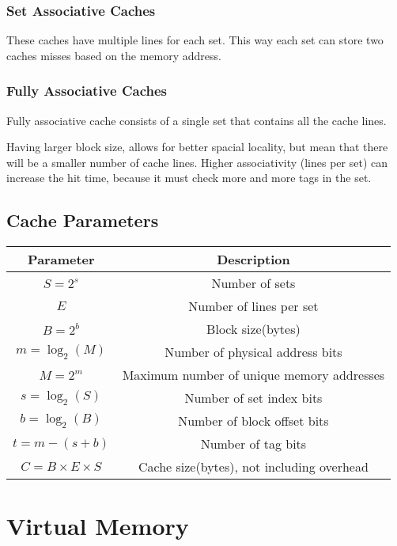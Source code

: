 \documentclass[10pt]{armath}
\begin{document}
\subsubsection{Set Associative Caches}%
\label{ssub:set_associative_caches}

These caches have multiple lines for each set. This way each set can store two
caches misses based on the memory address.

\subsubsection{Fully Associative Caches}%
\label{ssub:fully_associative_caches}

Fully associative cache consists of a single set that contains all the cache
lines.

Having larger block size, allows for better spacial locality, but mean that
there will be a smaller number of cache lines. Higher associativity (lines per
set) can increase the hit time, because it must check more and more tags in the
set.

\subsection{Cache Parameters}%
\label{sub:cache_parameters}

\begin{center}
  \begin{tabular}{c c}
  Parameter & Description\\\hline
  $S=2^s$ & Number of sets\\
  $E$ & Number of lines per set\\
  $B=2^b$ & Block size(bytes)\\
  $m=\log_2(M)$ & Number of physical address bits\\
  $M=2^m$ & Maximum number of unique memory addresses\\
  $s=\log_2(S)$ & Number of set index bits\\
  $b=\log_2(B)$ & Number of block offset bits\\
  $t=m-(s+b)$ & Number of tag bits\\
  $C=B\times E\times S$ & Cache size(bytes), not including overhead\\\hline
  \end{tabular}
\end{center}

\section{Virtual Memory}%
\label{sec:virtual_memory}
\end{document}
